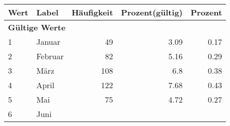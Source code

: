      \begin{longtable}{lXrrr}
     \toprule
     \textbf{Wert} & \textbf{Label} & \textbf{Häufigkeit} & \textbf{Prozent(gültig)} & \textbf{Prozent} \\
     \endhead
     \midrule
     \multicolumn{5}{l}{\textbf{Gültige Werte}}\\

     1 &
     \multicolumn{1}{X}{ Januar   } &


       \num{49} &
       \num[round-mode=places,round-precision=2]{3.09} &
         \num[round-mode=places,round-precision=2]{0.17} \\

     2 &
     \multicolumn{1}{X}{ Februar   } &


       \num{82} &
       \num[round-mode=places,round-precision=2]{5.16} &
         \num[round-mode=places,round-precision=2]{0.29} \\

     3 &
     \multicolumn{1}{X}{ März   } &


       \num{108} &
       \num[round-mode=places,round-precision=2]{6.8} &
         \num[round-mode=places,round-precision=2]{0.38} \\

     4 &
     \multicolumn{1}{X}{ April   } &


       \num{122} &
       \num[round-mode=places,round-precision=2]{7.68} &
         \num[round-mode=places,round-precision=2]{0.43} \\

     5 &
     \multicolumn{1}{X}{ Mai   } &


       \num{75} &
       \num[round-mode=places,round-precision=2]{4.72} &
         \num[round-mode=places,round-precision=2]{0.27} \\

     6 &
     \multicolumn{1}{X}{ Juni   } &



\end{longtable}
